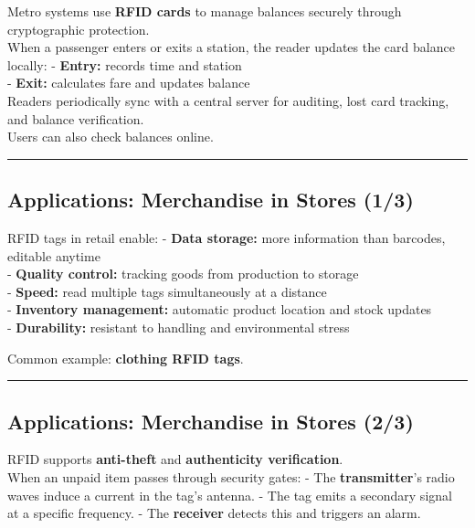 \documentclass[a4paper, 12pt]{book} %
\begin{document}
Metro systems use \textbf{RFID cards} to manage balances securely
through cryptographic protection.\\
When a passenger enters or exits a station, the reader updates the card
balance locally: - \textbf{Entry:} records time and station\\
- \textbf{Exit:} calculates fare and updates balance\\
Readers periodically sync with a central server for auditing, lost card
tracking, and balance verification.\\
Users can also check balances online.

\begin{center}\rule{0.5\linewidth}{0.5pt}\end{center}

\subsection{Applications: Merchandise in Stores
(1/3)}\label{applications-merchandise-in-stores-13}

RFID tags in retail enable: - \textbf{Data storage:} more information
than barcodes, editable anytime\\
- \textbf{Quality control:} tracking goods from production to storage\\
- \textbf{Speed:} read multiple tags simultaneously at a distance\\
- \textbf{Inventory management:} automatic product location and stock
updates\\
- \textbf{Durability:} resistant to handling and environmental stress

Common example: \textbf{clothing RFID tags}.

\begin{center}\rule{0.5\linewidth}{0.5pt}\end{center}

\subsection{Applications: Merchandise in Stores
(2/3)}\label{applications-merchandise-in-stores-23}

RFID supports \textbf{anti-theft} and \textbf{authenticity
verification}.\\
When an unpaid item passes through security gates: - The
\textbf{transmitter}'s radio waves induce a current in the tag's
antenna. - The tag emits a secondary signal at a specific frequency. -
The \textbf{receiver} detects this and triggers an alarm.
\end{document}
